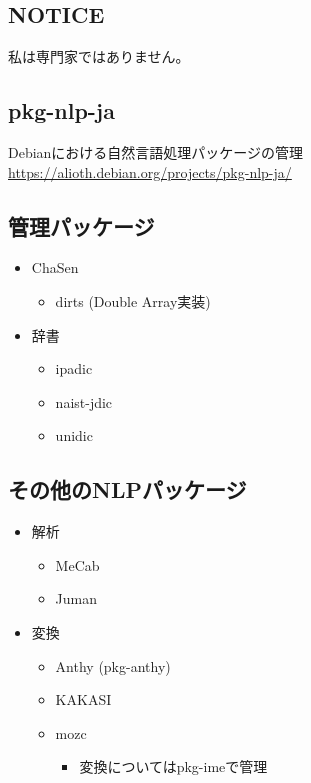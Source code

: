 \documentclass[mingoth,a4paper]{jsarticle}
\begin{document}


\subsection{NOTICE}
 私は専門家ではありません。

\subsection{pkg-nlp-ja}
 Debianにおける自然言語処理パッケージの管理
 \url{https://alioth.debian.org/projects/pkg-nlp-ja/}

\subsection{管理パッケージ}
\begin{itemize}
\item ChaSen
\begin{itemize}
  \item dirts (Double Array実装)
\end{itemize}
\item 辞書
\begin{itemize}
\item ipadic
\item naist-jdic
\item unidic
\end{itemize}
\end{itemize}

\subsection{その他のNLPパッケージ}
\begin{itemize}
\item 解析
  \begin{itemize}
  \item MeCab
  \item Juman
  \end{itemize}
\item 変換
  \begin{itemize}
  \item Anthy (pkg-anthy)
  \item KAKASI
  \item mozc
    \begin{itemize}
    \item 変換についてはpkg-imeで管理
    \end{itemize}
  \end{itemize}
\end{itemize}
\end{document}
